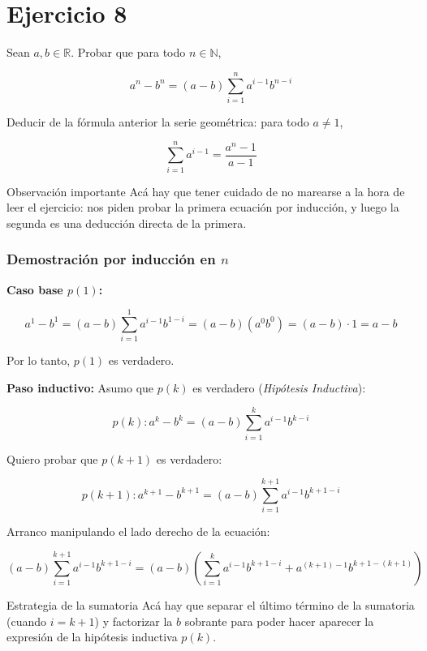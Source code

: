 \section{Ejercicio 8}

\begin{ejercicio}
Sean $a, b \in \mathbb{R}$. Probar que para todo $n \in \mathbb{N}$,

\[
a^n - b^n = (a-b)\sum_{i=1}^{n} a^{i-1}b^{n-i}
\]

Deducir de la fórmula anterior la serie geométrica: para todo $a \neq 1$,

\[
\sum_{i=1}^{n} a^{i-1} = \frac{a^{n}-1}{a-1}
\]

\begin{nota}{Observación importante}
Acá hay que tener cuidado de no marearse a la hora de leer el ejercicio: nos piden probar la primera ecuación por inducción, y luego la segunda es una deducción directa de la primera.
\end{nota}

\subsubsection*{Demostración por inducción en $n$}

\textbf{Caso base $p(1)$:}

\[
a^1 - b^1 = (a-b)\sum_{i=1}^{1} a^{i-1}b^{1-i} = (a-b)(a^0 b^0) = (a-b) \cdot 1 = a - b
\]

Por lo tanto, $p(1)$ es verdadero.

\vspace{0.3cm}

\textbf{Paso inductivo:} Asumo que $p(k)$ es verdadero (\textit{Hipótesis Inductiva}):

\[
p(k): a^k - b^k = (a-b)\sum_{i=1}^{k} a^{i-1}b^{k-i}
\]

Quiero probar que $p(k+1)$ es verdadero:

\[
p(k+1): a^{k+1} - b^{k+1} = (a-b)\sum_{i=1}^{k+1} a^{i-1}b^{k+1-i}
\]

Arranco manipulando el lado derecho de la ecuación:

\[
(a-b)\sum_{i=1}^{k+1} a^{i-1}b^{k+1-i} = (a-b) \left( \sum_{i=1}^{k} a^{i-1}b^{k+1-i} + a^{(k+1)-1}b^{k+1-(k+1)} \right)
\]

\begin{nota}{Estrategia de la sumatoria}
Acá hay que separar el último término de la sumatoria (cuando $i = k+1$) y factorizar la $b$ sobrante para poder hacer aparecer la expresión de la hipótesis inductiva $p(k)$.
\end{nota}


\end{ejercicio}
